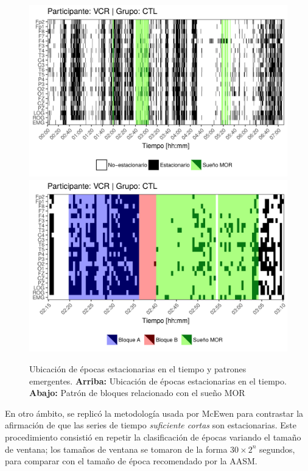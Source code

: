 \begin{figure}
\centering
\includegraphics[width=.9\textwidth]
{./img_art_dfa/zoom_noVCR_v2.png} \\
\includegraphics[width=.9\textwidth]
{./img_art_dfa/zoom_siVCR_v2.png}
\caption[Ubicación de épocas estacionarias en el tiempo y patrones emergentes]
{Ubicación de épocas estacionarias en el tiempo y patrones emergentes. \textbf{Arriba:} 
Ubicación de épocas estacionarias en el tiempo.
\textbf{Abajo:} Patrón de bloques relacionado con el sueño MOR}
\label{patroncito}
\end{figure}

En otro ámbito, se replicó la metodología usada por McEwen \cite{McEwen75} para contrastar la 
afirmación de que las series de tiempo \textit{suficiente cortas} son estacionarias. 
%
Este procedimiento consistió en repetir la clasificación de épocas variando el tamaño de ventana; 
los tamaños de ventana se tomaron de la forma $30 \times 2^{n}$ segundos, para comparar con el 
tamaño de época recomendado por la AASM.

